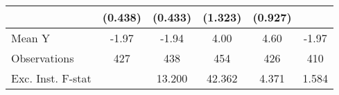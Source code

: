 {\begin{tabular}{l*{5}{c}}
            &     (0.438)         &     (0.433)         &     (1.323)         &     (0.927)         &                     \\
\midrule
Mean Y      &       -1.97         &       -1.94         &        4.00         &        4.60         &       -1.97         \\
Observations&         427         &         438         &         454         &         426         &         410         \\
Exc. Inst. F-stat&                     &      13.200         &      42.362         &       4.371         &       1.584         \\
\bottomrule
\end{tabular}
}
